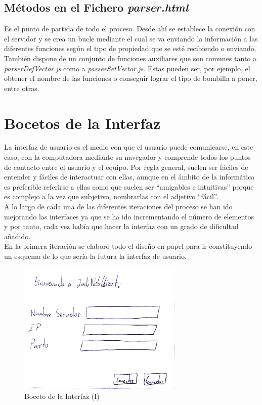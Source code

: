 \subsection{Métodos en el Fichero \textit{parser.html}}
Es el punto de partida de todo el proceso. Desde ahí se establece la conexión con el servidor y se crea un bucle mediante el cual se va enviando la información a las diferentes funciones según el tipo de propiedad que se esté recibiendo o enviando.
También dispone de un conjunto de funciones auxiliares que son comunes tanto a \textit{parserDefVector.js} como a \textit{parserSetVector.js}. Estas pueden ser, por ejemplo, el obtener el nombre de las funciones o conseguir lograr el tipo de bombilla a poner, entre otras.

\section{Bocetos de la Interfaz}
La interfaz de usuario es el medio con que el usuario puede comunicarse, en este caso, con la computadora mediante su navegador y comprende todos los puntos de contacto entre el usuario y el equipo. Por regla general, suelen ser fáciles de entender y fáciles de interactuar con ellas, aunque en el ámbito de la informática es preferible referirse a ellas como que suelen ser “amigables e intuitivas” porque es complejo a la vez que  subjetivo, nombrarlas con el adjetivo “fácil”.\cite{IU}\\

A lo largo de cada una de las diferentes iteraciones del proceso se han ido mejorando las interfaces ya que se ha ido incrementando el número de elementos y por tanto, cada vez había que hacer la interfaz con un grado de dificultad añadido.\\

En la primera iteración se elaboró todo el diseño en papel para ir constituyendo un esquema de lo que sería la futura la interfaz de usuario.\\
\begin{figure}[htb]
\centering
\includegraphics[width=0.7\textwidth]{./imagenes/boceto1}
\caption{Boceto de la Interfaz (I)} \label{fig:boceto1}
\end{figure}

